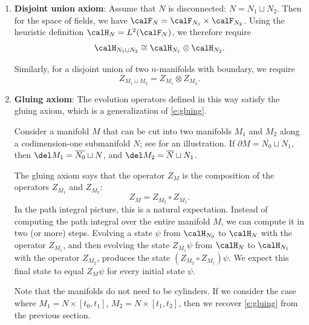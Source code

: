 \begin{enumerate}
  	\item {\bf Disjoint union axiom}: Assume that $N$ is disconnected:
      $N=N_1\sqcup N_2$. Then for the space of fields, we have
      $\calF_{N}=\calF_{N_1}\times \calF_{N_2}$. Using the heuristic definition
      $\calH_N=L^2(\calF_N)$, we therefore require
    \begin{equation}\label{e:qft-axiom1a}
      \calH_{N_1\sqcup N_2} \cong \calH_{N_1}\otimes \calH_{N_2}.
    \end{equation}
  
    Similarly, for a disjoint union of two $n$-manifolds with boundary, we 
    require
    \begin{equation}\label{e:qft-axiom1b}
      Z_{M_1\sqcup M_2} = Z_{M_1}\otimes Z_{M_2}.
    \end{equation}



  \item {\bf Gluing axiom}: The evolution operators defined in this way satisfy
    the gluing axiom, which is a generalization of \eqref{e:gluing}.

    Consider a manifold $M$ that can be cut into two manifolds $M_1$ and $M_2$
    along a codimension-one submanifold $N$; see  for an
    illustration. If $\partial M = \overline{N_0} \sqcup N_1$, then
    $\del M_{1} = \overline{N_0} \sqcup N$, and
    $\del M_{2} = \overline{N} \sqcup N_1$.

    The gluing axiom says that the operator $Z_{M}$ is the composition of the
    operators $Z_{M_1}$ and $Z_{M_2}$:
    \begin{equation}\label{e:gluing-axiom}
    	Z_{M} = Z_{M_2} \circ Z_{M_1}.
    \end{equation}
	In the path integral picture, this is a natural expectation. Instead of
	computing the path integral over the entire manifold $M$, we can compute it
	in two (or more) steps. Evolving a state $\psi$ from $\calH_{N_0}$ to
	$\calH_{N}$ with the operator $Z_{M_1}$, and then evolving the state
	$Z_{M_1} \psi$ from $\calH_{N}$ to $\calH_{N_1}$ with the operator
	$Z_{M_2}$, produces the state $(Z_{M_2} \circ Z_{M_1}) \psi$. We expect this
	final state to equal $Z_M \psi$ for every initial state $\psi$.

      Note that the manifolds do not need to be cylinders. If we consider the
      case where $M_1=N\times [t_0,t_1]$, $M_2=N\times [t_1,t_2]$, then we
      recover \eqref{e:gluing} from the previous section.
    \begin{figure}[ht]
    	\centering


\end{figure}
\end{enumerate}
